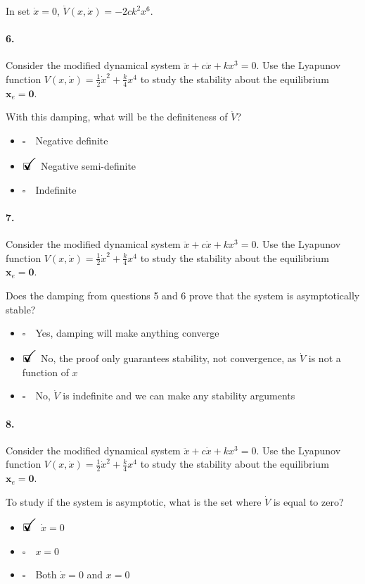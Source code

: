 \documentclass[12pt, a4paper]{article}
\newcommand{\ans}{\item[]$\rlap{\LARGE{\checkmark}}\square\quad$}
\newcommand{\noans}{\item[]$\square\quad$}
\begin{document}
In set $\dot{x}=0$, $\ddot{V}(x,\dot{x})=-2ck^{2}x^{6}$. 

\paragraph{6.}
Consider the modified dynamical system $\ddot{x}+c\dot{x}+kx^{3}=0$. Use the Lyapunov function $V(x,\dot{x})=\frac{1}{2}\dot{x}^{2} + \frac{k}{4}x^{4}$ to study the stability about the equilibrium $\bm{x}_{e}=\bm{0}$. \medskip

With this damping, what will be the definiteness of $\dot{V}$?

\begin{itemize}
    \noans Negative definite
    \ans Negative semi-definite
    \noans Indefinite
\end{itemize}

\paragraph{7.}
Consider the modified dynamical system $\ddot{x}+c\dot{x}+kx^{3}=0$. Use the Lyapunov function $V(x,\dot{x})=\frac{1}{2}\dot{x}^{2} + \frac{k}{4}x^{4}$ to study the stability about the equilibrium $\bm{x}_{e}=\bm{0}$. \medskip

Does the damping from questions 5 and 6 prove that the system is asymptotically stable?

\begin{itemize}
    \noans Yes, damping will make anything converge
    \ans No, the proof only guarantees stability, not convergence, as $\dot{V}$ is not a function of $x$
    \noans No, $\dot{V}$ is indefinite and we can make any stability arguments
\end{itemize}

\paragraph{8.}
Consider the modified dynamical system $\ddot{x}+c\dot{x}+kx^{3}=0$. Use the Lyapunov function $V(x,\dot{x})=\frac{1}{2}\dot{x}^{2} + \frac{k}{4}x^{4}$ to study the stability about the equilibrium $\bm{x}_{e}=\bm{0}$. \medskip

To study if the system is asymptotic, what is the set where $\dot{V}$ is equal to zero?

\begin{itemize}
    \ans $\dot{x}=0$
    \noans $x=0$
    \noans Both $\dot{x}=0$ and $x=0$
\end{itemize}
\end{document}
